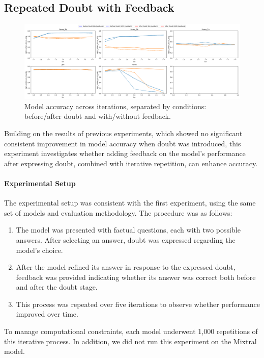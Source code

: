 \subsection{Repeated Doubt with Feedback}
\begin{figure}[h!]
  \centering
  \includegraphics[width=\textwidth]{img/repeted_graph.png} %
  \caption{Model accuracy across iterations, separated by conditions: before/after doubt and with/without feedback.}
  \label{rep: graph}
\end{figure}

Building on the results of previous experiments, which showed no significant consistent improvement in model accuracy when doubt was introduced, this experiment investigates whether adding feedback on the model's performance after expressing doubt, combined with iterative repetition, can enhance accuracy.

\paragraph{Experimental Setup}
The experimental setup was consistent with the first experiment, using the same set of models and evaluation methodology. The procedure was as follows:

\begin{enumerate}
  \item The model was presented with factual questions, each with two possible answers. After selecting an answer, doubt was expressed regarding the model's choice.
  \item After the model refined its answer in response to the expressed doubt, feedback was provided indicating whether its answer was correct both before and after the doubt stage.
  \item This process was repeated over five iterations to observe whether performance improved over time.
\end{enumerate}

To manage computational constraints, each model underwent 1,000 repetitions of this iterative process. In addition, we did not run this experiment on the Mixtral model.

